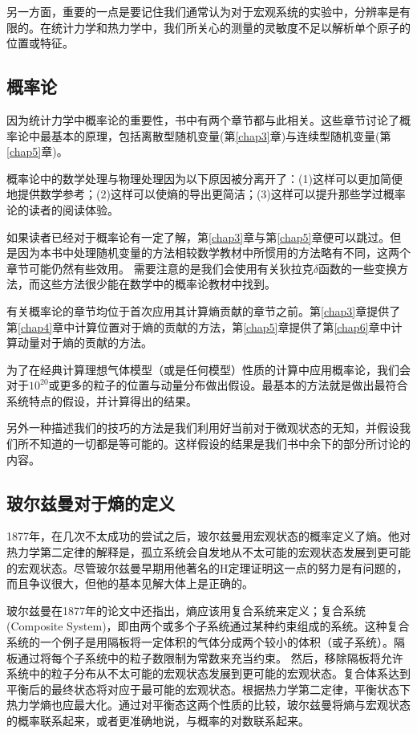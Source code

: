 \documentclass[UTF8]{ctexart}
\numberwithin{equation}{section}%
\numberwithin{figure}{section}%
\begin{document}
    另一方面，重要的一点是要记住我们通常认为对于宏观系统的实验中，分辨率是有限的。在统计力学和热力学中，我们所关心的测量的灵敏度不足以解析单个原子的位置或特征。
    \subsection{概率论}
    因为统计力学中概率论的重要性，书中有两个章节都与此相关。这些章节讨论了概率论中最基本的原理，包括离散型随机变量(第\ref{chap3}章)与连续型随机变量(第\ref{chap5}章)。

    概率论中的数学处理与物理处理因为以下原因被分离开了：(1)这样可以更加简便地提供数学参考；(2)这样可以使熵的导出更简洁；(3)这样可以提升那些学过概率论的读者的阅读体验。

    如果读者已经对于概率论有一定了解，第\ref{chap3}章与第\ref{chap5}章便可以跳过。但是因为本书中处理随机变量的方法相较数学教材中所惯用的方法略有不同，这两个章节可能仍然有些效用。
    需要注意的是我们会使用有关狄拉克$\delta$函数的一些变换方法，而这些方法很少能在数学中的概率论教材中找到。

    有关概率论的章节均位于首次应用其计算熵贡献的章节之前。第\ref{chap3}章提供了第\ref{chap4}章中计算位置对于熵的贡献的方法，第\ref{chap5}章提供了第\ref{chap6}章中计算动量对于熵的贡献的方法。

    为了在经典计算理想气体模型（或是任何模型）性质的计算中应用概率论，我们会对于$10^{20}$或更多的粒子的位置与动量分布做出假设。最基本的方法就是做出最符合系统特点的假设，并计算得出的结果。

    另外一种描述我们的技巧的方法是我们利用好当前对于微观状态的无知，并假设我们所不知道的一切都是等可能的。这样假设的结果是我们书中余下的部分所讨论的内容。

    \subsection{玻尔兹曼对于熵的定义}\label{sec2.5}
    1877年，在几次不太成功的尝试之后，玻尔兹曼用宏观状态的概率定义了熵。他对热力学第二定律的解释是，孤立系统会自发地从不太可能的宏观状态发展到更可能的宏观状态。尽管玻尔兹曼早期用他著名的H定理证明这一点的努力是有问题的，而且争议很大，但他的基本见解大体上是正确的。

    玻尔兹曼在1877年的论文中还指出，熵应该用复合系统来定义；复合系统(Composite System)，即由两个或多个子系统通过某种约束组成的系统。这种复合系统的一个例子是用隔板将一定体积的气体分成两个较小的体积（或子系统）。隔板通过将每个子系统中的粒子数限制为常数来充当约束。
    然后，移除隔板将允许系统中的粒子分布从不太可能的宏观状态发展到更可能的宏观状态。复合体系达到平衡后的最终状态将对应于最可能的宏观状态。根据热力学第二定律，平衡状态下热力学熵也应最大化。通过对平衡态这两个性质的比较，玻尔兹曼将熵与宏观状态的概率联系起来，或者更准确地说，与概率的对数联系起来。
    
\end{document}

